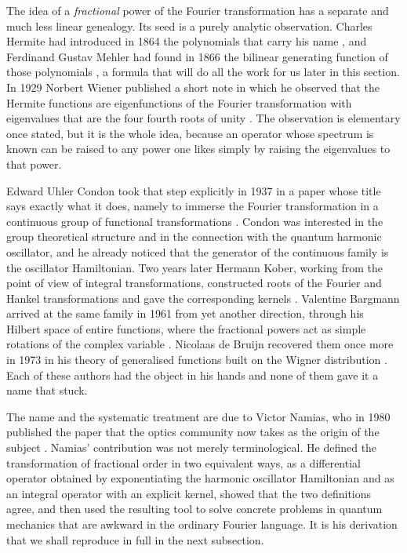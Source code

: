 		The idea of a \textit{fractional} power of the Fourier transformation has a separate and much less linear genealogy. Its seed is a purely analytic observation. Charles Hermite had introduced in 1864 the polynomials that carry his name \citep{hermite1864nouveau}, and Ferdinand Gustav Mehler had found in 1866 the bilinear generating function of those polynomials \citep{mehler1866entwicklung}, a formula that will do all the work for us later in this section. In 1929 Norbert Wiener published a short note in which he observed that the Hermite functions are eigenfunctions of the Fourier transformation with eigenvalues that are the four fourth roots of unity \citep{wiener1929hermitian}. The observation is elementary once stated, but it is the whole idea, because an operator whose spectrum is known can be raised to any power one likes simply by raising the eigenvalues to that power.

		Edward Uhler Condon took that step explicitly in 1937 in a paper whose title says exactly what it does, namely to immerse the Fourier transformation in a continuous group of functional transformations \citep{condon1937immersion}. Condon was interested in the group theoretical structure and in the connection with the quantum harmonic oscillator, and he already noticed that the generator of the continuous family is the oscillator Hamiltonian. Two years later Hermann Kober, working from the point of view of integral transformations, constructed roots of the Fourier and Hankel transformations and gave the corresponding kernels \citep{kober1939wurzeln}. Valentine Bargmann arrived at the same family in 1961 from yet another direction, through his Hilbert space of entire functions, where the fractional powers act as simple rotations of the complex variable \citep{bargmann1961hilbert}. Nicolaas de Bruijn recovered them once more in 1973 in his theory of generalised functions built on the Wigner distribution \citep{debruijn1973theory}. Each of these authors had the object in his hands and none of them gave it a name that stuck.

		The name and the systematic treatment are due to Victor Namias, who in 1980 published the paper that the optics community now takes as the origin of the subject \citep{namias1980fractional}. Namias' contribution was not merely terminological. He defined the transformation of fractional order in two equivalent ways, as a differential operator obtained by exponentiating the harmonic oscillator Hamiltonian and as an integral operator with an explicit kernel, showed that the two definitions agree, and then used the resulting tool to solve concrete problems in quantum mechanics that are awkward in the ordinary Fourier language. It is his derivation that we shall reproduce in full in the next subsection.

